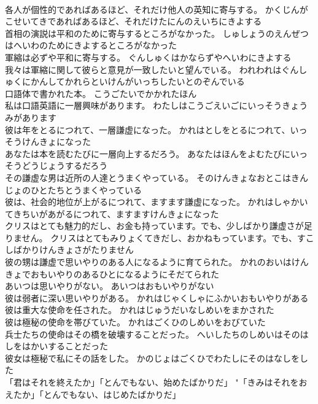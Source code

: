 \documentclass[8pt]{extreport}
\begin{document}
\begin{CJK}{UTF8}{min}
\\	各人が個性的であればあるほど、それだけ他人の英知に寄与する。	かくじんがこせいてきであればあるほど、それだけたにんのえいちにきよする 
\\	首相の演説は平和のために寄与するところがなかった。	しゅしょうのえんぜつはへいわのためにきよするところがなかった 
\\	軍縮は必ずや平和に寄与する。	ぐんしゅくはかならずやへいわにきよする 
\\	我々は軍縮に関して彼らと意見が一致したいと望んでいる。	われわれはぐんしゅくにかんしてかれらといけんがいっちしたいとのぞんでいる 
\\	口語体で書かれた本。	こうごたいでかかれたほん 
\\	私は口語英語に一層興味があります。	わたしはこうごえいごにいっそうきょうみがあります 
\\	彼は年をとるにつれて、一層謙虚になった。	かれはとしをとるにつれて、いっそうけんきょになった 
\\	あなたは本を読むたびに一層向上するだろう。	あなたはほんをよむたびにいっそうどうじょうするだろう 
\\	その謙虚な男は近所の人達とうまくやっている。	そのけんきょなおとこはきんじょのひとたちとうまくやっている 
\\	彼は、社会的地位が上がるにつれて、ますます謙虚になった。	かれはしゃかいてきちいがあがるにつれて、ますますけんきょになった 
\\	クリスはとても魅力的だし、お金も持っています。でも、少しばかり謙虚さが足りません。	クリスはとてもみりょくてきだし、おかねもっています。でも、すこしばかりけんきょさがたりません 
\\	彼の甥は謙虚で思いやりのある人になるように育てられた。	かれのおいはけんきょでおもいやりのあるひとになるようにそだてられた 
\\	あいつは思いやりがない。	あいつはおもいやりがない 
\\	彼は弱者に深い思いやりがある。	かれはじゃくしゃにふかいおもいやりがある 
\\	彼は重大な使命を任された。	かれはじゅうだいなしめいをまかされた 
\\	彼は極秘の使命を帯びていた。	かれはごくひのしめいをおびていた 
\\	兵士たちの使命はその橋を破壊することだった。	へいしたちのしめいはそのはしをはかいすることだった 
\\	彼女は極秘で私にその話をした。	かのじょはごくひでわたしにそのはなしをした 
\\	「君はそれを終えたか」「とんでもない、始めたばかりだ」	"「きみはそれをおえたか」｢とんでもない、はじめたばかりだ」 

\end{CJK}
\end{document}
